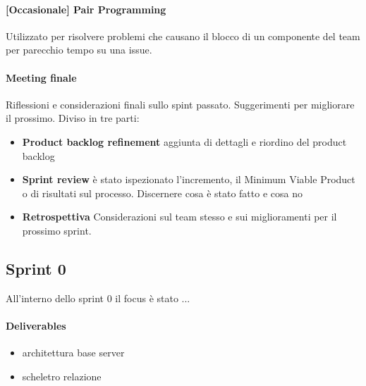     \paragraph{[Occasionale] Pair Programming } Utilizzato per risolvere problemi che causano il blocco di un componente del team per parecchio tempo su una issue.
    \paragraph{Meeting finale}
        Riflessioni e considerazioni finali sullo spint passato. Suggerimenti per migliorare il prossimo. Diviso in tre parti: 
        \begin{itemize}
        \item\textbf{Product backlog refinement} aggiunta di dettagli e riordino del product backlog
        \item\textbf{Sprint review} è stato ispezionato l'incremento, il Minimum Viable Product o di risultati sul processo. Discernere cosa è stato fatto e cosa no
        \item\textbf{Retrospettiva} Considerazioni sul team stesso e sui miglioramenti per il prossimo sprint. 
        \end{itemize}
        
        

\subsection{Sprint 0}
All'interno dello sprint 0 il focus è stato ...
\paragraph{Deliverables} 
\begin{itemize}
    \item architettura base server
    \item scheletro relazione
\end{itemize}


